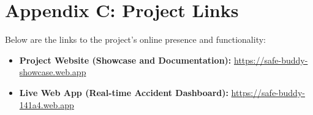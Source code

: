 \documentclass[12pt]{article}
\begin{document}
\section*{Appendix C: Project Links}

Below are the links to the project’s online presence and functionality:

\begin{itemize}
  \item \textbf{Project Website (Showcase and Documentation):} \href{https://safe-buddy-showcase.web.app}{https://safe-buddy-showcase.web.app}
  \item \textbf{Live Web App (Real-time Accident Dashboard):} \href{https://safe-buddy-141a4.web.app}{https://safe-buddy-141a4.web.app}
\end{itemize}
\end{document}
